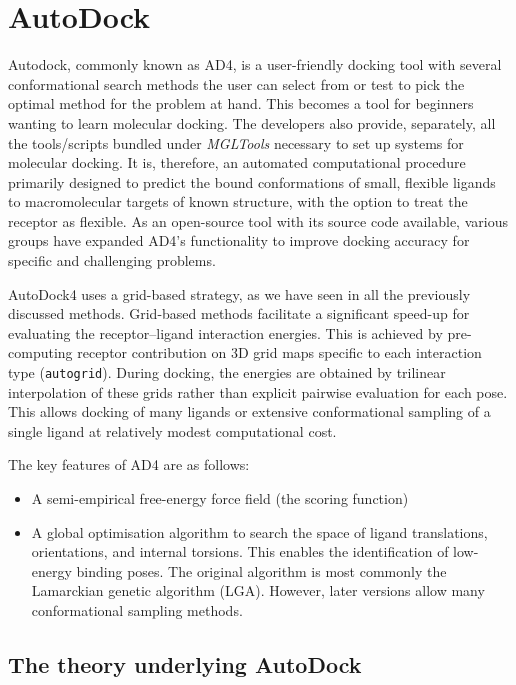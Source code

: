 \documentclass[12pt]{article}
\begin{document}
\section{AutoDock}
Autodock, commonly known as AD4, is a user-friendly docking tool with several conformational search methods the user can select from or test to pick the optimal method for the problem at hand. This becomes a tool for beginners wanting to learn molecular docking. The developers also provide, separately, all the tools/scripts bundled under \emph{MGLTools} necessary to set up systems for molecular docking. It is, therefore, an automated computational procedure primarily designed to predict the bound conformations of small, flexible ligands to macromolecular targets of known structure, with the option to treat the receptor as flexible. As an open-source tool with its source code available, various groups have expanded AD4's functionality to improve docking accuracy for specific and challenging problems\cite{CH7_Morris1998,CH7_Morris2009}. 

AutoDock4 uses a grid-based strategy, as we have seen in all the previously discussed methods. Grid-based methods facilitate a significant speed-up for evaluating the receptor--ligand interaction energies. This is achieved by pre-computing receptor contribution on 3D grid maps specific to each interaction type (\verb|autogrid|). During docking, the energies are obtained by trilinear interpolation of these grids rather than explicit pairwise evaluation for each pose\cite{CH7_Huey2007,CH7_Morris2009}. This allows docking of many ligands or extensive conformational sampling of a single ligand at relatively modest computational cost. 

The key features of AD4 are as follows:

\begin{itemize}
  \item A semi-empirical free-energy force field (the scoring function)
  \item A global optimisation algorithm to search the space of ligand translations, orientations, and internal torsions. This enables the identification of low-energy binding poses. The original algorithm is most commonly the Lamarckian genetic algorithm (LGA). However, later versions allow many conformational sampling methods.
\end{itemize}



\subsection{The theory underlying AutoDock}
\end{document}
